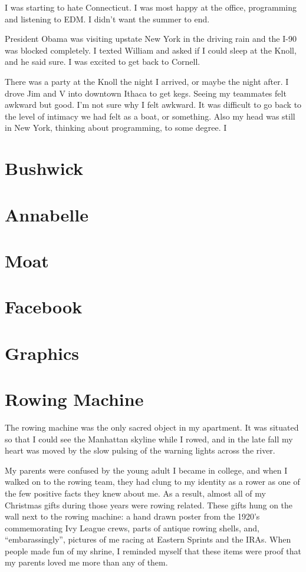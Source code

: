 \documentclass[12pt]{article}
\begin{document}
I was starting to hate Connecticut.  I was most happy at the office, programming
and listening to EDM.  I didn't want the summer to end.

President Obama was visiting upstate New York in the driving rain and the I-90
was blocked completely.  I texted William and asked if I could sleep at the
Knoll, and he said sure.  I was excited to get back to Cornell.

There was a party at the Knoll the night I arrived, or maybe the night after.  I
drove Jim and V into downtown Ithaca to get kegs.  Seeing my teammates felt
awkward but good.  I'm not sure why I felt awkward.  It was difficult to go back
to the level of intimacy we had felt as a boat, or something.  Also my head was
still in New York, thinking about programming, to some degree.  I  


\section{Bushwick}


\section{Annabelle}


\section{Moat}


\section{Facebook}


\section{Graphics}


\section{Rowing Machine}
The rowing machine was the only sacred object in my apartment.  It was situated
so that I could see the Manhattan skyline while I rowed, and in the late fall
my heart was moved by the slow pulsing of the warning lights across the river.

My parents were confused by the young adult I became in college, and when I
walked on to the rowing team, they had clung to my identity as a rower as one of
the few positive facts they knew about me.  As a result, almost all of my
Christmas gifts during those years were rowing related.  These gifts hung on the
wall next to the rowing machine: a hand drawn poster from the 1920's
commemorating Ivy League crews, parts of antique rowing shells, and,
``embarassingly'', pictures of me racing at Eastern Sprints and the IRAs.  When
people made fun of my shrine, I reminded myself that these items were proof that
my parents loved me more than any of them.
\end{document}
